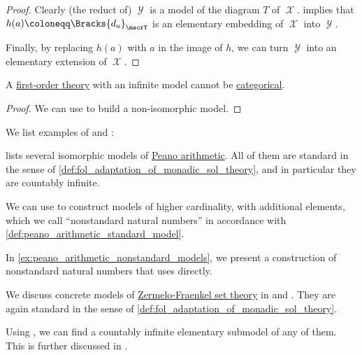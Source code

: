 \begin{proof}
  Clearly (the reduct of) \( \mscrY \) is a model of the diagram \( T \) of \( \mscrX \).  implies that \( h(a) \coloneqq \Bracks{d_a}_\mscrY \) is an elementary embedding of \( \mscrX \) into \( \mscrY \).

  Finally, by replacing \( h(a) \) with \( a \) in the image of \( h \), we can turn \( \mscrY \) into an elementary extension of \( \mscrX \).
\end{proof}

\begin{corollary}\label{thm:lowenheim_skolem_and_categoricity}
  A \hyperref[def:fol_theory]{first-order theory} with an infinite model cannot be \hyperref[def:fol_theory/categorical]{categorical}.
\end{corollary}
\begin{proof}
  We can use  to build a non-isomorphic model.
\end{proof}

\begin{example}\label{ex:lowenheim_skolem}
  We list examples of  and :
  \begin{thmenum}
      lists several isomorphic models of \hyperref[def:peano_arithmetic]{Peano arithmetic}. All of them are standard in the sense of \cref{def:fol_adaptation_of_monadic_sol_theory}, and in particular they are countably infinite.

    We can use  to construct models of higher cardinality, with additional elements, which we call \enquote{nonstandard natural numbers} in accordance with \cref{def:peano_arithmetic_standard_model}.

    In \cref{ex:peano_arithmetic_nonstandard_models}, we present a construction of nonstandard natural numbers that uses  directly.

     We discuss concrete models of \hyperref[def:zfc]{Zermelo-Fraenkel set theory} in  and . They are again standard in the sense of \cref{def:fol_adaptation_of_monadic_sol_theory}.

    Using , we can find a countably infinite elementary submodel of any of them. This is further discussed in .
  \end{thmenum}
\end{example}
